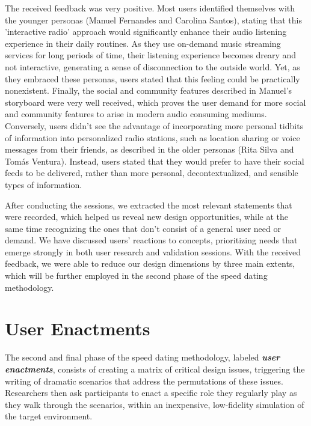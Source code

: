 {The received feedback was very positive. Most users identified themselves with the younger personas (Manuel Fernandes and Carolina Santos), stating that this 'interactive radio' approach would significantly enhance their audio listening experience in their daily routines. As they use on-demand music streaming services for long periods of time, their listening experience becomes dreary and not interactive, generating a sense of disconnection to the outside world. Yet, as they embraced these personas, users stated that this feeling could be practically nonexistent. Finally, the social and community features described in Manuel's storyboard were very well received, which proves the user demand for more social and community features to arise in modern audio consuming mediums. Conversely, users didn't see the advantage of incorporating more personal tidbits of information into personalized radio stations, such as location sharing or voice messages from their friends, as described in the older personas (Rita Silva and Tomás Ventura). Instead, users stated that they would prefer to have their social feeds to be delivered, rather than more personal, decontextualized, and sensible types of information.

After conducting the sessions, we extracted the most relevant statements that were recorded, which helped us reveal new design opportunities, while at the same time recognizing the ones that don't consist of a general user need or demand. We have discussed users' reactions to concepts, prioritizing needs that emerge strongly in both user research and validation sessions. With the received feedback, we were able to reduce our design dimensions by three main extents, which will be further employed in the second phase of the speed dating methodology.

\section{User Enactments}
\label{sec:userenactments}

The second and final phase of the speed dating methodology, labeled \textbf{\textit{user enactments}}, consists of creating a matrix of critical design issues, triggering the writing of dramatic scenarios that address the permutations of these issues. Researchers then ask participants to enact a specific role they regularly play as they walk through the scenarios, within an inexpensive, low-fidelity simulation of the target environment. ~\cite{Davidoff2007}

}
